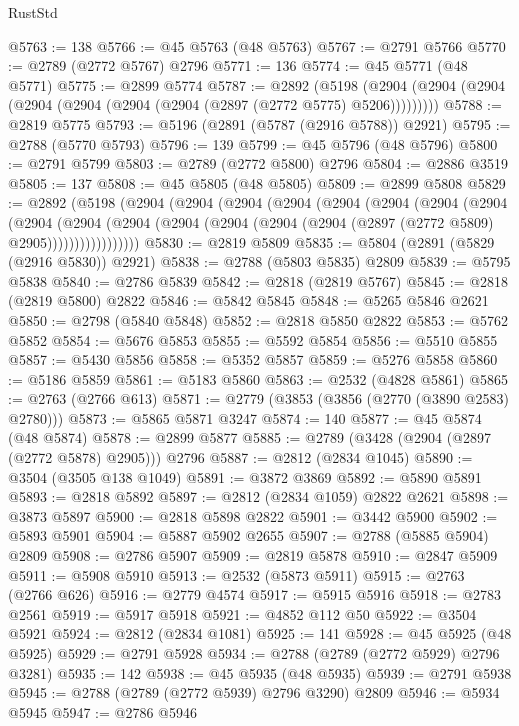 \begin{lexlean}{RustStd}
\begin{coremodule}
@5763 := 138
@5766 := @45 @5763 (@48 @5763)
@5767 := @2791 @5766
@5770 := @2789 (@2772 @5767) @2796
@5771 := 136
@5774 := @45 @5771 (@48 @5771)
@5775 := @2899 @5774
@5787 := @2892
    (@5198 (@2904 (@2904 (@2904 (@2904 (@2904 (@2904 (@2904 (@2897 (@2772 @5775) @5206)))))))))
@5788 := @2819 @5775
@5793 := @5196 (@2891 (@5787 (@2916 @5788)) @2921)
@5795 := @2788 (@5770 @5793)
@5796 := 139
@5799 := @45 @5796 (@48 @5796)
@5800 := @2791 @5799
@5803 := @2789 (@2772 @5800) @2796
@5804 := @2886 @3519
@5805 := 137
@5808 := @45 @5805 (@48 @5805)
@5809 := @2899 @5808
@5829 := @2892
    (@5198
      (@2904
        (@2904
          (@2904
            (@2904
              (@2904
                (@2904
                  (@2904
                    (@2904
                      (@2904
                        (@2904
                          (@2904
                            (@2904 (@2904 (@2904 (@2904 (@2897 (@2772 @5809) @2905)))))))))))))))))
@5830 := @2819 @5809
@5835 := @5804 (@2891 (@5829 (@2916 @5830)) @2921)
@5838 := @2788 (@5803 @5835) @2809
@5839 := @5795 @5838
@5840 := @2786 @5839
@5842 := @2818 (@2819 @5767)
@5845 := @2818 (@2819 @5800) @2822
@5846 := @5842 @5845
@5848 := @5265 @5846 @2621
@5850 := @2798 (@5840 @5848)
@5852 := @2818 @5850 @2822
@5853 := @5762 @5852
@5854 := @5676 @5853
@5855 := @5592 @5854
@5856 := @5510 @5855
@5857 := @5430 @5856
@5858 := @5352 @5857
@5859 := @5276 @5858
@5860 := @5186 @5859
@5861 := @5183 @5860
@5863 := @2532 (@4828 @5861)
@5865 := @2763 (@2766 @613)
@5871 := @2779 (@3853 (@3856 (@2770 (@3890 @2583) @2780)))
@5873 := @5865 @5871 @3247
@5874 := 140
@5877 := @45 @5874 (@48 @5874)
@5878 := @2899 @5877
@5885 := @2789 (@3428 (@2904 (@2897 (@2772 @5878) @2905))) @2796
@5887 := @2812 (@2834 @1045)
@5890 := @3504 (@3505 @138 @1049)
@5891 := @3872 @3869
@5892 := @5890 @5891
@5893 := @2818 @5892
@5897 := @2812 (@2834 @1059) @2822 @2621
@5898 := @3873 @5897
@5900 := @2818 @5898 @2822
@5901 := @3442 @5900
@5902 := @5893 @5901
@5904 := @5887 @5902 @2655
@5907 := @2788 (@5885 @5904) @2809
@5908 := @2786 @5907
@5909 := @2819 @5878
@5910 := @2847 @5909
@5911 := @5908 @5910
@5913 := @2532 (@5873 @5911)
@5915 := @2763 (@2766 @626)
@5916 := @2779 @4574
@5917 := @5915 @5916
@5918 := @2783 @2561
@5919 := @5917 @5918
@5921 := @4852 @112 @50
@5922 := @3504 @5921
@5924 := @2812 (@2834 @1081)
@5925 := 141
@5928 := @45 @5925 (@48 @5925)
@5929 := @2791 @5928
@5934 := @2788 (@2789 (@2772 @5929) @2796 @3281)
@5935 := 142
@5938 := @45 @5935 (@48 @5935)
@5939 := @2791 @5938
@5945 := @2788 (@2789 (@2772 @5939) @2796 @3290) @2809
@5946 := @5934 @5945
@5947 := @2786 @5946

\end{coremodule}
\end{lexlean}
